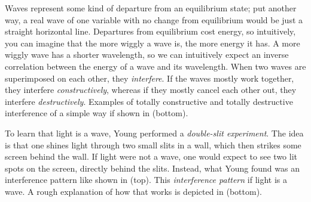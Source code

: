 Waves represent some kind of departure from an equilibrium state; put another
way, a real wave of one variable with no change from equilibrium would be just 
a straight horizontal line. Departures from equilibrium cost energy, so
intuitively, you can imagine that the more wiggly a wave is, the more energy it
has. A more wiggly wave has a shorter wavelength, so we can intuitively expect
an inverse correlation between the energy of a wave and its wavelength.
When two waves are superimposed on each other, they {\it
interfere}. If the waves mostly work together, they interfere {\it
constructively}, whereas if they mostly cancel each other out, they interfere
{\it destructively}. Examples of totally constructive and totally destructive
interference of a simple way if shown in  (bottom).

To learn that light is a wave, Young performed a {\it double-slit
experiment}. The idea is that one shines light
through two small slits in a wall, which then strikes some screen behind the
wall. If light were not a wave, one would expect to see two lit spots on the
screen, directly behind the slits. Instead, what Young found was an interference
pattern like shown in  (top). This {\it interference
pattern} if light is a wave. A rough explanation of
how that works is depicted in  (bottom).

